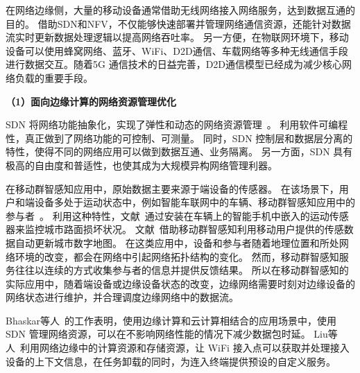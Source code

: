 在网络边缘侧，大量的移动设备通常借助无线网络接入网络服务，达到数据互通的目的。
借助SDN和NFV，不仅能够快速部署并管理网络通信资源，还能针对数据流实时更新数据处理逻辑以提高网络吞吐率。
另一方便，在物联网环境下，移动设备可以使用蜂窝网络、蓝牙、WiFi、D2D通信、车载网络等多种无线通信手段进行数据交互。随着5G 通信技术的日益完善，D2D通信模型已经成为减少核心网络负载的重要手段。

\textbf{（1）面向边缘计算的网络资源管理优化}

SDN 将网络功能抽象化，实现了弹性和动态的网络资源管理~\cite{DBLP:journals/jzusc/WangWYG18}。
利用软件可编程性，真正做到了网络功能的可控制、可测量。
同时，SDN 控制层和数据层分离的特性，使得不同的网络应用可以做到数据互通、业务隔离。
另一方面，SDN 具有极高的自由度和普适性，也使其成为大规模异构网络管理利器。



在移动群智感知应用中，原始数据主要来源于端设备的传感器。
在该场景下，用户和端设备多处于运动状态中，例如智能车联网中的车辆、移动群智感知应用中的参与者~\cite{DBLP:journals/jsac/LyuNTLWGP17}。
利用这种特性，文献~通过安装在车辆上的智能手机中嵌入的运动传感器来监控城市路面损坏状况。
文献~借助移动群智感知利用移动用户提供的传感数据自动更新城市数字地图。
在这类应用中，设备和参与者随着地理位置和所处网络环境的改变，都会在网络中引起网络拓扑结构的变化。
然而，移动群智感知服务往往以连续的方式收集参与者的信息并提供反馈结果。
所以在移动群智感知的实际应用中，随着端设备或边缘设备状态的改变，边缘网络需要时刻对边缘设备的网络状态进行维护，并合理调度边缘网络中的数据流。

Bhaskar等人~\cite{DBLP:conf/infocom/RimalVM16}的工作表明，使用边缘计算和云计算相结合的应用场景中，使用 SDN 管理网络资源，可以在不影响网络性能的情况下减少数据包时延。
Liu等人~\cite{DBLP:conf/edge/LiuWB16}利用网络边缘中的计算资源和存储资源，让 WiFi 接入点可以获取并处理接入设备的上下文信息，在任务卸载的同时，为连入终端提供预设的自定义服务。



